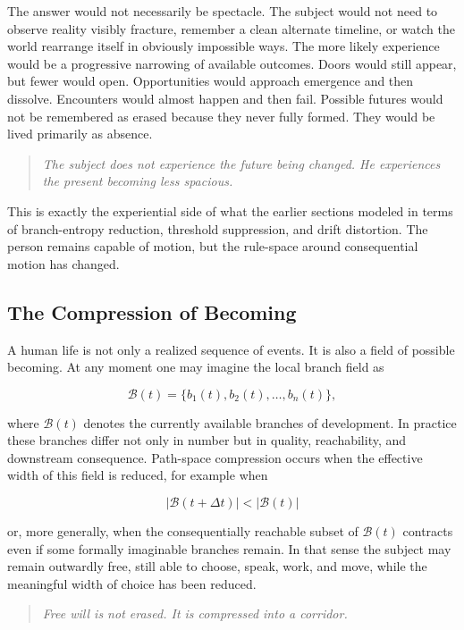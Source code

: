 \documentclass[12pt]{article}
\begin{document}
The answer would not necessarily be spectacle. The subject would not need to observe reality visibly fracture, remember a clean alternate timeline, or watch the world rearrange itself in obviously impossible ways. The more likely experience would be a progressive narrowing of available outcomes. Doors would still appear, but fewer would open. Opportunities would approach emergence and then dissolve. Encounters would almost happen and then fail. Possible futures would not be remembered as erased because they never fully formed. They would be lived primarily as absence.

\begin{quote}
\textit{The subject does not experience the future being changed. He experiences the present becoming less spacious.}
\end{quote}

This is exactly the experiential side of what the earlier sections modeled in terms of branch-entropy reduction, threshold suppression, and drift distortion. The person remains capable of motion, but the rule-space around consequential motion has changed.

\subsection{The Compression of Becoming}

A human life is not only a realized sequence of events. It is also a field of possible becoming. At any moment one may imagine the local branch field as

\[
\mathcal B(t) = \{b_1(t), b_2(t), \dots, b_n(t)\},
\]

where $\mathcal B(t)$ denotes the currently available branches of development. In practice these branches differ not only in number but in quality, reachability, and downstream consequence. Path-space compression occurs when the effective width of this field is reduced, for example when

\[
|\mathcal B(t+\Delta t)| < |\mathcal B(t)|
\]

or, more generally, when the consequentially reachable subset of $\mathcal B(t)$ contracts even if some formally imaginable branches remain. In that sense the subject may remain outwardly free, still able to choose, speak, work, and move, while the meaningful width of choice has been reduced.

\begin{quote}
\textit{Free will is not erased. It is compressed into a corridor.}
\end{quote}
\end{document}
